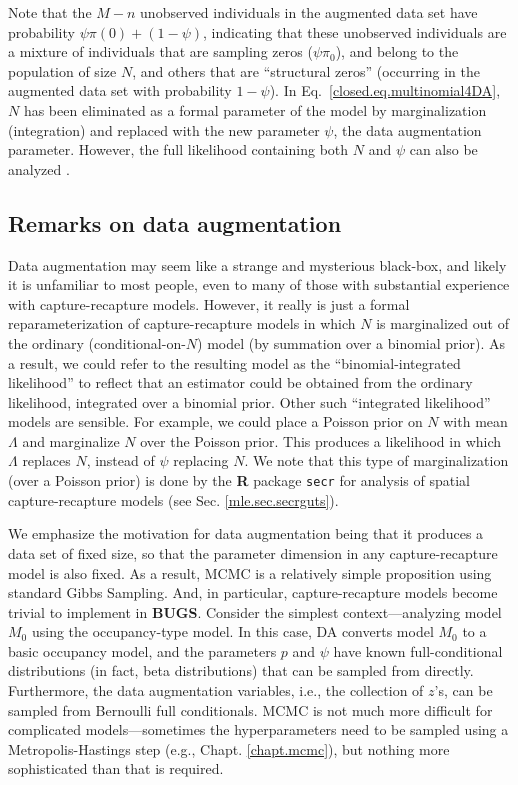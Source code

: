Note that the $M-n$ unobserved individuals in the augmented data set
have probability $\psi \pi(0) + (1-\psi)$, indicating that these
unobserved individuals are a mixture of individuals that are sampling
zeros ($\psi \pi_0$), and belong to the population of size $N$, and
others that are ``structural zeros'' (occurring in the augmented data
set with probability $1 - \psi$). In Eq.~\ref{closed.eq.multinomial4DA}, $N$
has been eliminated as a formal parameter of the model by
marginalization (integration) and replaced with the new parameter
$\psi$, the data augmentation parameter.
However, the full likelihood containing both $N$ and $\psi$ can also be
analyzed \citep[see][]{royle_etal:2007}.


\subsection{Remarks on data augmentation}
\label{closed.sec.remarks}

Data augmentation may seem like a strange and mysterious black-box,
and likely it is unfamiliar to most people, even to many of those with substantial
experience with capture-recapture models. However, it really is just a
formal reparameterization of capture-recapture models in which $N$ is
marginalized out of the ordinary (conditional-on-$N$) model (by
summation over a binomial prior).
As a result, we could refer to the resulting model as the
``binomial-integrated likelihood'' to reflect that an estimator could
be obtained from the ordinary likelihood, integrated over a binomial
prior. Other such ``integrated likelihood'' models are sensible. For
example, we could place a Poisson prior on $N$ with mean $\Lambda$ and
marginalize $N$ over the Poisson prior. This produces a likelihood in
which $\Lambda$ replaces $N$, instead of $\psi$ replacing $N$.  We
note that this type of marginalization (over a Poisson prior) is done by
the {\bf R} package \mbox{\tt secr} for analysis of spatial
capture-recapture models (see Sec. \ref{mle.sec.secrguts}).


We emphasize the motivation for data augmentation being that it
produces a data set of fixed size, so that the parameter dimension in
any capture-recapture model is also fixed.  As a result, MCMC is a
relatively simple proposition using standard Gibbs Sampling.  And, in
particular, capture-recapture models become trivial to implement in
{\bf BUGS}. Consider the simplest context---analyzing model $M_0$
using the occupancy-type model. In this case, DA converts model $M_0$
to a basic occupancy model, and the parameters $p$ and $\psi$ have
known full-conditional distributions (in fact, beta distributions)
that can be sampled from directly.  Furthermore, the data augmentation
variables, i.e., the collection of $z$'s, can be sampled from
Bernoulli full conditionals. MCMC is not much more difficult for
complicated models---sometimes the hyperparameters need to be sampled
using a Metropolis-Hastings step (e.g., Chapt. \ref{chapt.mcmc}), but
nothing more sophisticated than that is required.

